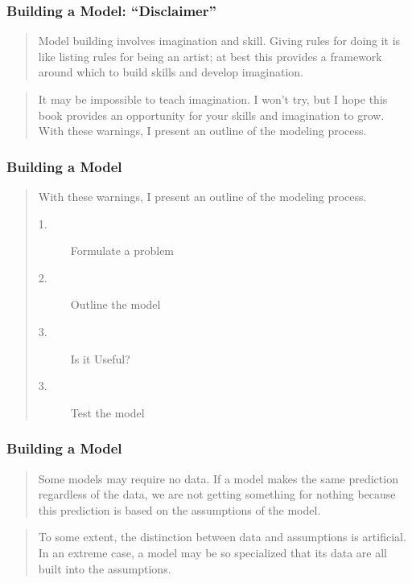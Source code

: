 \begin{frame}
    \frametitle{Building a Model: ``Disclaimer''}
    \begin{verse}
        Model building involves imagination and skill. Giving rules for doing
        it is like listing rules for being an artist; at best this provides a
        framework around which to build skills and develop imagination. 
    \end{verse} 
    \begin{verse}
        It may
        be impossible to teach imagination. I won't try, but I hope this book
        provides an opportunity for your skills and imagination to grow. With
        these warnings, I present an outline of the modeling process.
    \end{verse}
\end{frame}


\begin{frame}
    \frametitle{Building a Model}
    \begin{verse}
        With these warnings, I present an outline of the modeling process.
    \begin{description}
        \item[1.] {Formulate a problem}
        \item[2.] {Outline the model}
        \item[3.] {Is it Useful?}
        \item[3.] {Test the model}
    \end{description}
    \end{verse}
\end{frame}

\begin{frame}
    \frametitle{Building a Model}
    \begin{verse}
        Some models may require no data. If a model makes the same prediction
        regardless of the data, we are not getting something for nothing because
        this prediction is based on the assumptions of the model. 
    \end{verse}
   
    \begin{verse}
        To some extent,
        the distinction between data and assumptions is artificial. In an extreme
        case, a model may be so specialized that its data are all built into the
        assumptions.
    \end{verse}
\end{frame}

